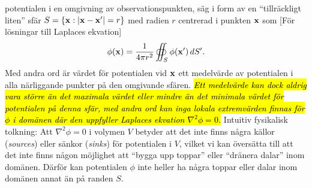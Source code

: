 {{{{  potentialen} i en omgivning av observationspunkten, s{\"a}g i form av en
  ``tillr{\"a}ckligt liten'' sf{\"a}r $S=\{{\bf x}:|{\bf x}-{\bf x}'|=r\}$
  med radien $r$ centrerad i punkten ${\bf x}$ som
  [F{\"o}r l{\"o}sningar till Laplaces ekvation]
  \hl{$$
    \phi({\bf x})={{1}\over{4\pi r^2}}\oiint_{S}\phi({\bf x}')\,dS'.
  $$}
  Med andra ord {\"a}r v{\"a}rdet f{\"o}r potentialen vid ${\bf x}$ ett
  medelv{\"a}rde av potentialen i alla n{\"a}rliggande punkter p{\aa} den
  omgivande sf{\"a}ren. {\hl{\it Ett medelv{\"a}rde kan dock aldrig vara
  st{\"o}rre {\"a}n det maximala v{\"a}rdet eller mindre {\"a}n det minimala
  v{\"a}rdet f{\"o}r potentialen p{\aa} denna sf{\"a}r, med andra ord kan
  inga lokala extremv{\"a}rden finnas f{\"o}r $\phi$ i dom{\"a}nen d{\"a}r
  den uppfyller Laplaces ekvation $\nabla^2\phi=0$.}}}
\bigskip
\noindent
Intuitiv fysikalisk tolkning: Att $\nabla^2\phi=0$ i volymen $V$ betyder att det
inte finns n{\aa}gra k{\"a}llor ({\it sources}) eller s{\"a}nkor ({\it sinks})
f{\"o}r potentialen i $V$, vilket vi kan {\"o}vers{\"a}tta till att det inte
finns n{\aa}gon m{\"o}jlighet att ``bygga upp toppar'' eller ``dr{\"a}nera
dalar'' inom dom{\"a}nen. D{\"a}rf{\"o}r kan potentialen $\phi$ inte heller ha
n{\aa}gra toppar eller dalar inom dom{\"a}nen annat {\"a}n p{\aa} randen $S$.
\vfill\eject

}}
